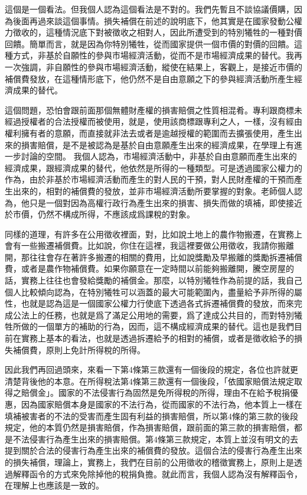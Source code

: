 \documentclass[]{ctexbook}
\begin{document}
這個是一個看法。但我個人認為這個看法是不對的。我們先暫且不談協議價購，因為後面再過來談這個事情。損失補償在前述的說明底下，他其實是在國家發動公權力徵收的，這種情況底下對被徵收之相對人，因此所遭受到的特別犧牲的一種對價回饋。簡單而言，就是因為你特別犧牲，從而國家提供一個市價的對價的回饋。這種方式，非基於自願性的參與市場經濟活動，從而不是市場經濟成果的替代。我再一次強調，非自願性的參與市場經濟活動，縱使在結果上，客觀上，是接近市價的補償費發放，在這種情形底下，他仍然不是自由意願之下的參與經濟活動所產生經濟成果的替代。

這個問題，恐怕會跟前面那個無體財產權的損害賠償之性質相混肴。專利跟商標未經過授權者的合法授權而被使用，就是，使用該商標跟專利之人，一樣，沒有經由權利擁有者的意願，而直接就非法去或者是逾越授權的範圍而去擴張使用，產生出來的損害賠償，是不是被認為是基於自由意願產生出來的經濟成果，在學理上有進一步討論的空間。
我個人認為，市場經濟活動中，非基於自由意願而產生出來的經濟成果，跟經濟成果的替代，他依然是所得的一種類型。可是透過國家公權力的作為，由於非基於市場經濟活動而產生的對人民的干預，對人民財產權的干預而產生出來的，相對的補償費的發放，並非市場經濟活動所要掌握的對象。老師個人認為，他只是一個對因為高權行政行為產生出來的損害、損失而做的填補，即使接近於市價，仍然不構成所得，不應該成爲課稅的對象。

同樣的道理，有許多在公用徵收裡面，對，比如說土地上的農作物搬遷，在實務上會有一些搬遷補償費。比如說，你住在這裡，我這裡要做公用徵收，我請你搬離開，那往往會存在著許多搬遷的相關的費用，比如說獎勵及早搬離的獎勵拆遷補償費，或者是農作物補償費。如果你願意在一定時間以前能夠搬離開，騰空房屋的話，實務上往往也會發給獎勵的補償金。那麼，以特別犧牲作為前提的話，我自己個人比較傾向認為，在特別犧牲可以涵蓋的最大可能範圍內，盡量給予非所得的屬性，也就是認為這是一個國家公權力行使底下透過各式拆遷補償費的發放，而來完成公法上的任務，也就是爲了滿足公用地的需要，爲了達成公共目的，而對特別犧牲所做的一個單方的補助的行為，因而，這不構成經濟成果的替代。這也是我們目前在實務上基本的看法，也就是透過拆遷給予的相對的補償，或者是徵收給予的損失補償費，原則上免計所得稅的所得。

因此我們再回過頭來，來看一下第4條第三款還有一個後段的規定，各位也許就更清楚背後他的本意。在所得稅法第4條第三款還有一個後段，「依國家賠償法規定取得之賠償金」。國家的不法侵害行為固然是免所得稅的所得，理由不在給予稅捐優惠，因為國家賠償本身是國家的不法行為，從而國家的不法行為，他本質上一樣在填補被害者的不法的受害而產生固有利益的損害賠償，所以第4條的第三款的後段規定，他的本質仍然是損害賠償，作為損害賠償，跟前面的第三款的損害賠償，都是不法侵害行為產生出來的損害賠償。第4條第三款規定，本質上並沒有明文的去提到關於合法的侵害行為產生出來的補償費的發放。這個合法的侵害行為產生出來的損失補償，理論上，實務上，我們在目前的公用徵收的稽徵實務上，原則上是透過解釋函令的方式來免除掉他的稅捐負擔。就此而言，我個人認為沒有解釋函令，在理解上也應該是一致的。
\end{document}
